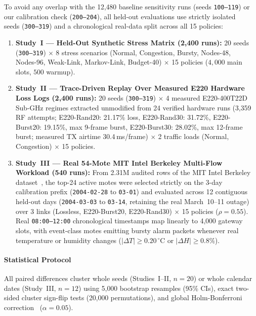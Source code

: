 \documentclass[journal]{IEEEtran}
\begin{document}
To avoid any overlap with the 12,480 baseline sensitivity runs (seeds \texttt{100--119}) or our calibration check (\texttt{200--204}), all held-out evaluations use strictly isolated seeds (\texttt{300--319}) and a chronological real-data split across all 15 policies:
\begin{enumerate}
\item \textbf{Study~I --- Held-Out Synthetic Stress Matrix (2,400 runs):} 20 seeds (\texttt{300--319}) $\times$ 8 stress scenarios (Normal, Congestion, Bursty, Nodes-48, Nodes-96, Weak-Link, Markov-Link, Budget-40) $\times$ 15 policies ($4{,}000$ main slots, $500$ warmup).
\item \textbf{Study~II --- Trace-Driven Replay Over Measured E220 Hardware Loss Logs (2,400 runs):} 20 seeds (\texttt{300--319}) $\times$ 4 measured E220-400T22D Sub-GHz regimes extracted unmodified from 24 verified hardware runs (3,359 RF attempts; E220-Rand20: 21.17\% loss, E220-Rand30: 31.72\%, E220-Burst20: 19.15\%, max 9-frame burst, E220-Burst30: 28.02\%, max 12-frame burst; measured TX airtime 30.4\,ms/frame) $\times$ 2 traffic loads (Normal, Congestion) $\times$ 15 policies.
\item \textbf{Study~III --- Real 54-Mote MIT Intel Berkeley Multi-Flow Workload (540 runs):} From 2.31M audited rows of the MIT Intel Berkeley dataset~\cite{madden2004intel}, the top-24 active motes were selected strictly on the 3-day calibration prefix (\texttt{2004-02-28} to \texttt{03-01}) and evaluated across 12 contiguous held-out days (\texttt{2004-03-03} to \texttt{03-14}, retaining the real March~10--11 outage) over 3 links (Lossless, E220-Burst20, E220-Rand30) $\times$ 15 policies ($\rho{=}0.55$). Real \texttt{08:00--12:00} chronological timestamps map linearly to 4,000 gateway slots, with event-class motes emitting bursty alarm packets whenever real temperature or humidity changes ($|\Delta T|{\ge}0.20\,^{\circ}\text{C}$ or $|\Delta H|{\ge}0.8\%$).
\end{enumerate}

\paragraph{Statistical Protocol}
All paired differences cluster whole seeds (Studies~I--II, $n{=}20$) or whole calendar dates (Study~III, $n{=}12$) using 5,000 bootstrap resamples (95\% CIs), exact two-sided cluster sign-flip tests (20,000 permutations), and global Holm-Bonferroni correction~\cite{holm1979simple} ($\alpha{=}0.05$).
\end{document}
